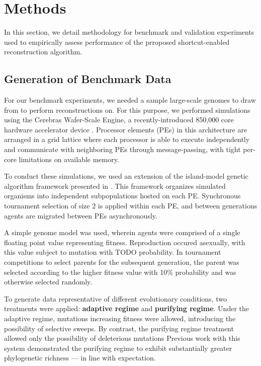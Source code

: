 \section{Methods} \label{sec:methods}

In this section, we detail methodology for benchmark and validation experiments used to empirically assess performance of the prroposed shortcut-enabled reconstruction algorithm.

\subsection{Generation of Benchmark Data}

For our benchmark experiments, we needed a sample large-scale genomes to draw from to perform reconstructions on.
For this purpose, we performed simulations using the Cerebras Wafer-Scale Engine, a recently-introduced 850,000 core hardware accelerator device \citep{TODO}.
Processor elements (PEs) in this architecture are arranged in a grid lattice where each processor is able to execute independently and communicate with neighboring PEs through message-passing, with tight per-core limitations on available memory.

To conduct these simulations, we used an extension of the island-model genetic algorithm framework presented in \citep{moreno2024trackable}.
This framework organizes simulated organisms into independent subpopulations hosted on each PE.
Synchronous tournament selection of size 2 is applied within each PE, and between generations agents are migrated between PEs asynchronously.


A simple genome model was used, wherein agents were comprised of a single floating point value representing fitness.
Reproduction occured asexually, with this value subject to mutation with TODO probability.
In tournament competitions to select parents for the subsequent generation, the parent was selected according to the higher fitness value with 10\% probability and was otherwise selected randomly.

To generate data representative of different evolutionary conditions, two treatments were applied:
\textbf{adaptive regime} and \textbf{purifying regime}.
Under the adaptive regime, mutations increasing fitness were allowed, introducing the possibility of selective sweeps.
By contrast, the purifying regime treatment allowed only the possibility of deleterious mutations
Previous work with this system demonstrated the purifying regime to exhibit substantially greater phylogenetic richness --- in line with expectation.

